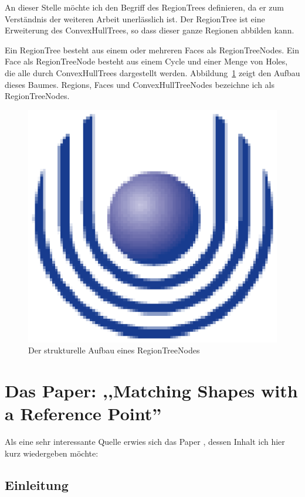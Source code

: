 An dieser Stelle möchte ich den Begriff des RegionTrees definieren, da er zum Verständnis der weiteren Arbeit unerlässlich ist. Der RegionTree ist eine Erweiterung des ConvexHullTrees, so dass dieser ganze Regionen abbilden kann. 

Ein RegionTree besteht aus einem oder mehreren Faces als RegionTreeNodes. Ein Face als RegionTreeNode besteht aus einem Cycle und einer Menge von Holes, die alle durch ConvexHullTrees dargestellt werden. Abbildung~\ref{fig:RegionTreeNode} zeigt den Aufbau dieses Baumes. Regions, Faces und ConvexHullTreeNodes bezeichne ich als RegionTreeNodes.

\begin{figure}
	\centering
	\includegraphics{feu_logo2.eps}
	\caption{Der strukturelle Aufbau eines RegionTreeNodes}
	\label{fig:RegionTreeNode}
\end{figure}

\section[Matching Shapes with a Reference Point]{Das Paper: ,,Matching Shapes with a Reference Point'' }\label{AARR}

Als eine sehr interessante Quelle erwies sich das Paper \cite{AAR}, dessen Inhalt ich hier kurz wiedergeben möchte:

\subsection{Einleitung}

